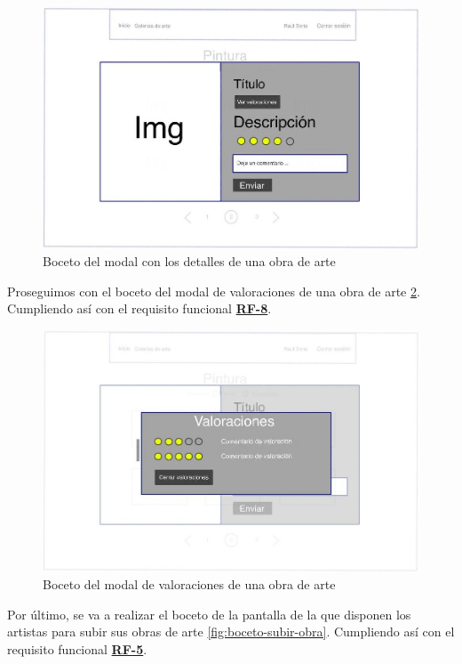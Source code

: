 \begin{figure}[H]
  \centering
  \includegraphics[width=\textwidth]{img/modal}
  \caption{Boceto del modal con los detalles de una obra de arte}
  \label{fig:boceto-obra}
\end{figure}

\newpage

Proseguimos con el boceto del modal de valoraciones de una obra de arte
\ref{fig:boceto-valoraciones}. Cumpliendo así con el requisito funcional
\hyperref[tab:rf-8]{\textbf{RF-8}}.

\begin{figure}[H]
  \centering
  \includegraphics[width=\textwidth]{img/valoraciones}
  \caption{Boceto del modal de valoraciones de una obra de arte}
  \label{fig:boceto-valoraciones}
\end{figure}

\newpage

Por último, se va a realizar el boceto de la pantalla de la que disponen los artistas para
subir sus obras de arte \ref{fig:boceto-subir-obra}. Cumpliendo así con el requisito
funcional \hyperref[tab:rf-5]{\textbf{RF-5}}.

